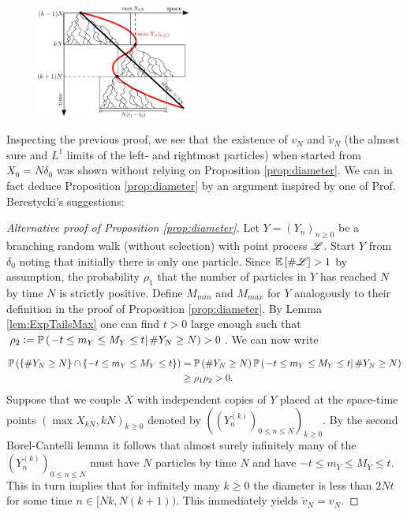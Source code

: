 \begin{figure}
\centering
\includegraphics[width=0.45\textwidth]{graphics/g1.png}
\end{figure}

Inspecting the previous proof, we see that the existence of $v_N$ and $\tilde{v}_N$ (the almost sure and $L^1$ limits of the left- and rightmost particles) when started from $X_0 = N \delta_0$ was shown without relying on Proposition \ref{prop:diameter}. We can in fact deduce Proposition \ref{prop:diameter} by an argument inspired by one of Prof. Berestycki's suggestions:

\begin{proof}[Alternative proof of Proposition \ref{prop:diameter}]
Let $Y = (Y_n)_{n \geq 0}$ be a branching random walk (without selection) with point process $\mathscr{L}$. Start $Y$ from $\delta_{0}$ noting that initially there is only one particle. Since $\mathbb{E}\left[ \# \mathscr{L} \right] > 1$ by assumption, the probability $\rho_1$ that the number of particles in $Y$ has reached $N$ by time $N$ is strictly positive. Define $M_{min}$ and $M_{max}$ for $Y$ analogously to their definition in the proof of Proposition \ref{prop:diameter}. By Lemma \ref{lem:ExpTailsMax} one can find $t > 0$ large enough such that $\rho_2 \vcentcolon= \mathbb{P} \left( \left. -t \leq m_Y \leq M_Y \leq t  \right| \# Y_N \geq N \right) > 0$. We can now write

\begin{align*}
\mathbb{P} \left( \{ \# Y_N \geq N \} \cap \{-t \leq m_Y \leq M_Y \leq t \} \right) &= \mathbb{P} \left( \# Y_N \geq N \right) \mathbb{P} \left( \left. -t \leq m_Y \leq M_Y \leq t  \right| \# Y_N \geq N \right) \\
															   &\geq \rho_1 \rho_2 > 0. 
\end{align*}
Suppose that we couple $X$ with independent copies of $Y$  placed at the space-time points $(\max X_{kN}, kN)_{k \geq 0}$ denoted by $((Y^{(k)}_n)_{0 \leq n \leq N})_{k \geq 0}$. By the second Borel-Cantelli lemma it follows that almost surely infinitely many of the $(Y^{(k)}_n)_{0 \leq n \leq N}$ must have $N$ particles by time $N$ and have $-t \leq m_Y \leq M_Y \leq t $. This in turn implies that for infinitely many $k \geq 0$ the diameter is less than $2Nt$ for some time $n \in [Nk, N(k+1))$. This immediately yields $\tilde{v}_N = v_N$. 
\end{proof}

